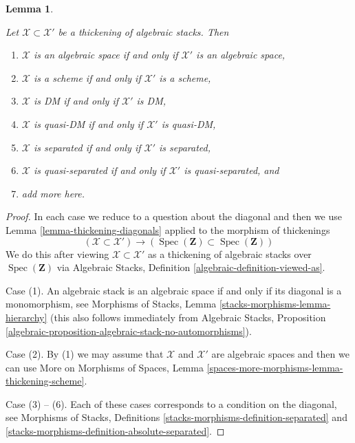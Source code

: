 \documentclass[10pt,a4paper]{amsart}
\newenvironment{reference}{\comment}{\endcomment}
\theoremstyle{plain}
\newtheorem{lemma}[subsection]{Lemma}
\theoremstyle{definition}
\theoremstyle{remark}
\numberwithin{equation}{subsection}
\def\Spec{\mathop{\mathrm{Spec}}}
\renewenvironment{reference}{}{}
\renewcommand{\cite}[2][]{}
\begin{document}
\begin{lemma}
\label{lemma-thickening-properties}
\begin{reference}
\cite[Theorem 2.2.5]{Conrad-moduli}
\end{reference}
Let $\mathcal{X} \subset \mathcal{X}'$ be a thickening of algebraic
stacks. Then
\begin{enumerate}
\item $\mathcal{X}$ is an algebraic space if and only if $\mathcal{X}'$
is an algebraic space,
\item $\mathcal{X}$ is a scheme if and only if $\mathcal{X}'$ is a scheme,
\item $\mathcal{X}$ is DM if and only if $\mathcal{X}'$ is DM,
\item $\mathcal{X}$ is quasi-DM if and only if $\mathcal{X}'$ is quasi-DM,
\item $\mathcal{X}$ is separated if and only if $\mathcal{X}'$ is separated,
\item $\mathcal{X}$ is quasi-separated if and only if $\mathcal{X}'$ is
quasi-separated, and
\item add more here.
\end{enumerate}
\end{lemma}

\begin{proof}
In each case we reduce to a question about the diagonal and then
we use Lemma \ref{lemma-thickening-diagonals} applied to the
morphism of thickenings
$$
(\mathcal{X} \subset \mathcal{X}') \to
\left(\Spec(\mathbf{Z}) \subset \Spec(\mathbf{Z})\right)
$$
We do this after viewing
$\mathcal{X} \subset \mathcal{X}'$ as a thickening of algebraic stacks
over $\Spec(\mathbf{Z})$ via
Algebraic Stacks, Definition \ref{algebraic-definition-viewed-as}.

\medskip\noindent
Case (1). An algebraic stack is an algebraic space if and only if its
diagonal is a monomorphism, see
Morphisms of Stacks, Lemma \ref{stacks-morphisms-lemma-hierarchy}
(this also follows immediately from Algebraic Stacks,
Proposition \ref{algebraic-proposition-algebraic-stack-no-automorphisms}).

\medskip\noindent
Case (2). By (1) we may assume that $\mathcal{X}$ and $\mathcal{X}'$
are algebraic spaces and then we can use
More on Morphisms of Spaces, Lemma
\ref{spaces-more-morphisms-lemma-thickening-scheme}.

\medskip\noindent
Case (3) -- (6). Each of these cases corresponds to a condition
on the diagonal, see Morphisms of Stacks, Definitions
\ref{stacks-morphisms-definition-separated} and
\ref{stacks-morphisms-definition-absolute-separated}.
\end{proof}
\end{document}
